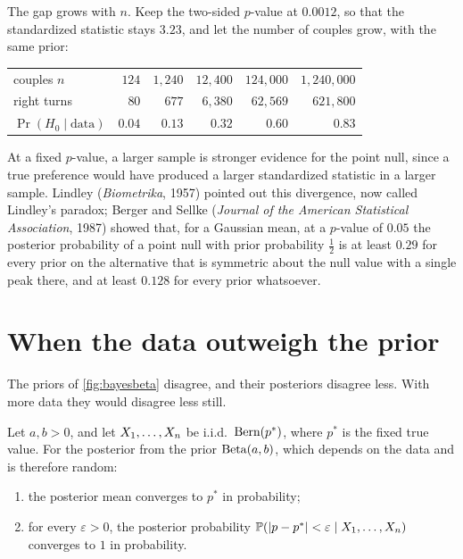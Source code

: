 The gap grows with $n$.
Keep the two-sided $p$-value at $0.0012$, so that the standardized statistic stays $3.23$, and let the number of couples grow, with the same prior:
\begin{center}
\small
\begin{tabular}{@{}lrrrrr@{}}
\toprule
couples $n$ & $124$ & $1{,}240$ & $12{,}400$ & $124{,}000$ & $1{,}240{,}000$ \\
right turns & $80$ & $677$ & $6{,}380$ & $62{,}569$ & $621{,}800$ \\
$\Pr(H_0 \mid \text{data})$ & $0.04$ & $0.13$ & $0.32$ & $0.60$ & $0.83$ \\
\bottomrule
\end{tabular}
\end{center}
At a fixed $p$-value, a larger sample is stronger evidence for the point null, since a true preference would have produced a larger standardized statistic in a larger sample.
Lindley (\textit{Biometrika}, 1957) pointed out this divergence, now called Lindley's paradox; Berger and Sellke (\textit{Journal of the American Statistical Association}, 1987) showed that, for a Gaussian mean, at a $p$-value of $0.05$ the posterior probability of a point null with prior probability $\frac12$ is at least $0.29$ for every prior on the alternative that is symmetric about the null value with a single peak there, and at least $0.128$ for every prior whatsoever.

\section{When the data outweigh the prior}
\label{sec:bayes-bvm}

The priors of \cref{fig:bayesbeta} disagree, and their posteriors disagree less.
With more data they would disagree less still.


\begin{theorem}
\label{thm:prior-washout}
Let $a, b > 0$, and let $X_1, \ldots, X_n$ be i.i.d.\ $\text{Bern}(p^*)$, where $p^*$ is the fixed true value. For the posterior from the prior $\mathrm{Beta}(a, b)$, which depends on the data and is therefore random:
\begin{enumerate}[nosep]
\item the posterior mean converges to $p^*$ in probability;
\item for every $\varepsilon > 0$, the posterior probability $\mathbb{P}(\lvert p - p^*\rvert < \varepsilon \mid X_1, \ldots, X_n)$ converges to $1$ in probability.
\end{enumerate}
\end{theorem}

